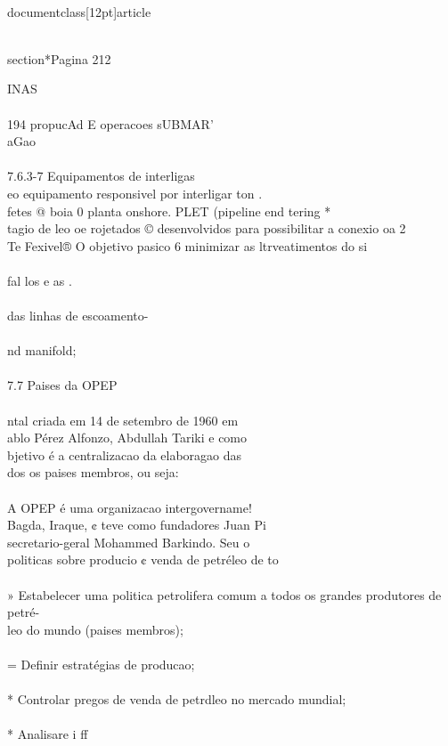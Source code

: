 \\documentclass[12pt]{article}
\begin{document}
\\section*{Pagina 212}

INAS\\
\\
194 propucAd E operacoes sUBMAR'\\
aGao\\
\\
7.6.3-7 Equipamentos de interligas\\
eo equipamento responsivel por interligar ton .\\
fetes @ boia 0 planta onshore. PLET (pipeline end tering *\\
tagio de leo oe rojetados © desenvolvidos para possibilitar a conexio oa 2\\
Te Fexivel® O objetivo pasico 6 minimizar as ltrveatimentos do si\\
\\
fal los e as .\\
\\
das linhas de escoamento-\\
\\
nd manifold;\\
\\
7.7 Paises da OPEP\\
\\
ntal criada em 14 de setembro de 1960 em\\
ablo Pérez Alfonzo, Abdullah Tariki e como\\
bjetivo é a centralizacao da elaboragao das\\
dos os paises membros, ou seja:\\
\\
A OPEP é uma organizacao intergovername!\\
Bagda, Iraque, ¢ teve como fundadores Juan Pi\\
secretario-geral Mohammed Barkindo. Seu o\\
politicas sobre producio ¢ venda de petréleo de to\\
\\
» Estabelecer uma politica petrolifera comum a todos os grandes produtores de petré-\\
leo do mundo (paises membros);\\
\\
= Definir estratégias de producao;\\
\\
* Controlar pregos de venda de petrdleo no mercado mundial;\\
\\
* Analisare i ff\\
\end{document}
